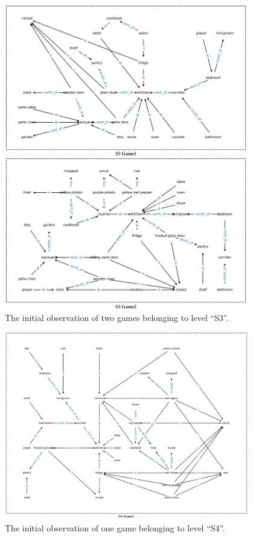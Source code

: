 \documentclass[11pt]{article}
\begin{document}
\begin{figure}[t!]
\centering
\includegraphics[width=0.95\textwidth]{obs_example_3.pdf}
\caption{The initial observation of two games belonging to level ``S3''. }
\label{obs_example_3}
\end{figure}

\begin{figure}[t!]
\centering
\includegraphics[width=0.95\textwidth]{obs_example_4.pdf}
\caption{The initial observation of one game belonging to level ``S4''. }
\label{obs_example_4}
\end{figure}
\end{document}
